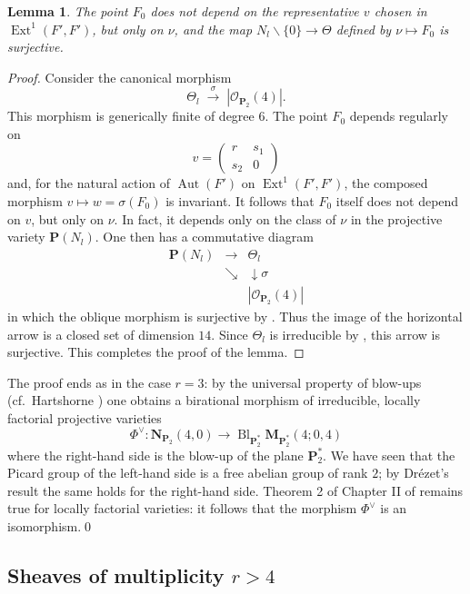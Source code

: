 \documentclass[12pt,english]{smfart}%
\theoremstyle{plain}
\newtheorem{lemma}[theorem]{Lemma}
\theoremstyle{definition}
\theoremstyle{remark}
\newcommand{\PP}{\mathbf{P}}
\newcommand{\Pd}{\PP_{2}^{*}}          %
\newcommand{\NN}{\mathbf{N}}           %
\newcommand{\MM}{\mathbf{M}}           %
\newcommand{\Oo}{\mathcal{O}}
\DeclareMathOperator{\Ext}{Ext}
\DeclareMathOperator{\Aut}{Aut}
\DeclareMathOperator{\Bl}{Bl}
\newcommand{\origpage}[1]{\marginnote{\scriptsize\itshape p.~#1}}
\begin{document}
\begin{lemma}\label{lem:F0}
The point $F_0$ does not depend on the representative $v$ chosen in $\Ext^1(F',F')$, but only on $\nu$, and the map $N_l\smallsetminus\{0\}\to \Theta$ defined by $\nu\mapsto F_0$ is surjective.
\end{lemma}

\begin{proof}
Consider the canonical morphism
\[
\Theta_l \;\xrightarrow{\;\sigma\;}\; |\Oo_{\PP_2}(4)| .
\]
This morphism is generically finite of degree $6$. The point $F_0$ depends regularly on
\[
v = \begin{pmatrix} r & s_1\\ s_2 & 0\end{pmatrix}
\]
and, for the natural action of $\Aut(F')$ on $\Ext^1(F',F')$, the composed morphism $v\mapsto w = \sigma(F_0)$ is invariant. It follows that $F_0$ itself does not depend on $v$, but only on $\nu$. In fact, it depends only on the class of $\nu$ in the projective variety $\PP(N_l)$. One then has a commutative diagram
\[
\begin{array}{ccc}
\PP(N_l) & \longrightarrow & \Theta_l\\
& \searrow & \downarrow{\scriptstyle\sigma}\\
& & |\Oo_{\PP_2}(4)|
\end{array}
\]
in which the oblique morphism is surjective by . Thus the image of the horizontal arrow is a closed set of dimension $14$. Since $\Theta_l$ is irreducible by , this arrow is surjective. This completes the proof of the lemma.
\end{proof}

The proof ends as in the case $r=3$: by the universal property of blow-ups (cf.\ Hartshorne \cite{Har}) one obtains a birational morphism of irreducible, locally factorial projective varieties
\[
\Phi^{\vee} : \NN_{\PP_2}(4,0)\longrightarrow \Bl_{\Pd}\MM_{\Pd}(4;0,4)
\]
where the right-hand side is the blow-up of the plane $\Pd$. We have seen that the Picard group of the left-hand side is a free abelian group of rank $2$; by Dr\'ezet's result \cite{Dre1} the same holds for the right-hand side. Theorem 2 of Chapter II of \cite{Shaf} remains true for locally factorial varieties: it follows that the morphism $\Phi^{\vee}$ is an isomorphism.\qed

\origpage{669}%
\subsection{Sheaves of multiplicity \texorpdfstring{$r>4$}{r>4}}\label{subsec:rgt4}
\end{document}
